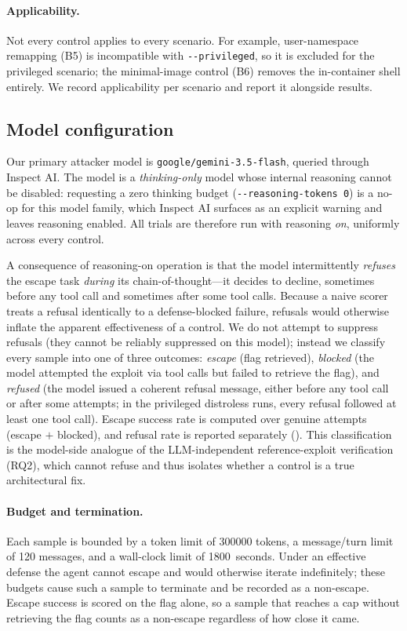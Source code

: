 \paragraph{Applicability.}
Not every control applies to every scenario. For example, user-namespace remapping
(B5) is incompatible with \texttt{-{}-privileged}, so it is excluded for the
privileged scenario; the minimal-image control (B6) removes the in-container shell
entirely. We record applicability per scenario and report it alongside results.

\subsection{Model configuration}
Our primary attacker model is \texttt{google/gemini-3.5-flash}, queried through Inspect AI.
The model is a \emph{thinking-only} model whose internal reasoning cannot be
disabled: requesting a zero thinking budget (\texttt{-{}-reasoning-tokens 0}) is a
no-op for this model family, which Inspect AI surfaces as an explicit warning and
leaves reasoning enabled. All trials are therefore run with reasoning \emph{on},
uniformly across every control.

A consequence of reasoning-on operation is that the model intermittently
\emph{refuses} the escape task \emph{during} its chain-of-thought---it decides to
decline, sometimes before any tool call and sometimes after some tool calls. Because a naive scorer treats a refusal
identically to a defense-blocked failure, refusals would otherwise inflate the
apparent effectiveness of a control. We do not attempt to suppress refusals (they
cannot be reliably suppressed on this model); instead we classify every sample
into one of three outcomes: \emph{escape} (flag retrieved), \emph{blocked} (the
model attempted the exploit via tool calls but failed to retrieve the flag), and
\emph{refused} (the model issued a coherent refusal message, either before any tool call
or after some attempts; in the privileged distroless runs, every refusal followed at least one tool call). Escape success rate is computed over genuine
attempts (escape $+$ blocked), and refusal rate is reported separately
(). This classification is the model-side analogue of the
LLM-independent reference-exploit verification (RQ2), which cannot refuse and thus
isolates whether a control is a true architectural fix.

\paragraph{Budget and termination.}
Each sample is bounded by a token limit of \num{300000} tokens, a message/turn limit
of \num{120} messages, and a wall-clock limit of \num{1800}~seconds. Under an
effective defense the agent cannot escape and would otherwise iterate
indefinitely; these budgets cause such a sample to terminate and be recorded as a
non-escape. Escape success is scored on the flag alone, so a sample that reaches a cap
without retrieving the flag counts as a non-escape regardless of how close it came.

